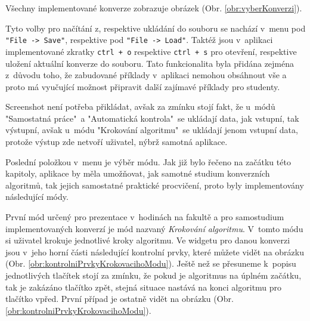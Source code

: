 Všechny implementované konverze zobrazuje obrázek (Obr. \ref{obr:vyberKonverzi}).




Tyto volby pro načítání z, respektive ukládání do souboru se nachází v~menu pod \texttt{"File -> Save"}, respektive pod \texttt{"File -> Load"}. Taktéž jsou v~aplikaci implementované zkratky \texttt{ctrl + o} respektive \texttt{ctrl + s} pro otevření, respektive uložení aktuální konverze do souboru. Tato funkcionalita byla přidána zejména z~důvodu toho, že zabudované příklady v~aplikaci nemohou obsáhnout vše a proto má vyučující možnost připravit další zajímavé příklady pro studenty.  

Screenshot není potřeba přikládat, avšak za zmínku stojí fakt, že u~módů "Samostatná práce"\ a "Automatická kontrola"\ se ukládají data, jak vstupní, tak výstupní, avšak u~módu "Krokování algoritmu"\ se ukládají jenom vstupní data, protože výstup zde netvoří uživatel, nýbrž samotná aplikace.


Poslední položkou v~menu je výběr módu. Jak již bylo řečeno na začátku této kapitoly, aplikace by měla umožňovat, jak samotné studium konverzních algoritmů, tak jejich samostatné praktické procvičení, proto byly implementovány následující módy.


První mód určený pro prezentace v~hodinách na fakultě a pro samostudium implementovaných konverzí je mód nazvaný \textit{Krokování algoritmu}. V~tomto módu si uživatel krokuje jednotlivé kroky algoritmu. Ve widgetu pro danou konverzi jsou v~jeho horní části následující kontrolní prvky, které můžete vidět na obrázku (Obr. \ref{obr:kontrolniPrvkyKrokovacihoModu}). Ještě než se přesuneme k~popisu jednotlivých tlačítek stojí za zmínku, že pokud je algoritmus na úplném začátku, tak je zakázáno tlačítko zpět, stejná situace nastává na konci algoritmu pro tlačítko vpřed. První případ je ostatně vidět na obrázku (Obr. \ref{obr:kontrolniPrvkyKrokovacihoModu}).


